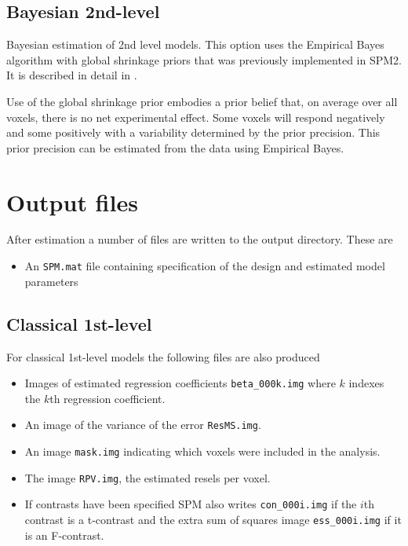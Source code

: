 \subsection{Bayesian 2nd-level}

Bayesian estimation of 2nd level models. This option uses the Empirical Bayes algorithm with global shrinkage priors that was previously implemented in SPM2. It is described in detail in \cite{karl_posterior}.

Use of the global shrinkage prior embodies a prior belief that, on average over all voxels, there is no net experimental effect. Some voxels will respond negatively and some positively with a variability determined by the prior precision. This prior precision can be estimated from the data using Empirical Bayes. 

\section{Output files}

After estimation a number of files are written to the output directory. These are

\begin{itemize}
\item{An \verb!SPM.mat! file containing specification of the design and estimated model parameters}
\end{itemize}

\subsection{Classical 1st-level}

For classical 1st-level models the following files are also produced

\begin{itemize}

\item{Images of estimated regression coefficients  \verb!beta_000k.img! where $k$ indexes the $k$th regression coefficient.}

\item{An image of the variance of the error \verb!ResMS.img!.}

\item{An image \verb!mask.img! indicating which voxels were included in the analysis.}

\item{The image \verb!RPV.img!, the estimated resels per voxel.}

\item{If contrasts have been specified SPM also writes \verb!con_000i.img!  if the $i$th contrast is a t-contrast and the extra sum of squares image \verb!ess_000i.img! if it is an F-contrast.} 

\end{itemize}

